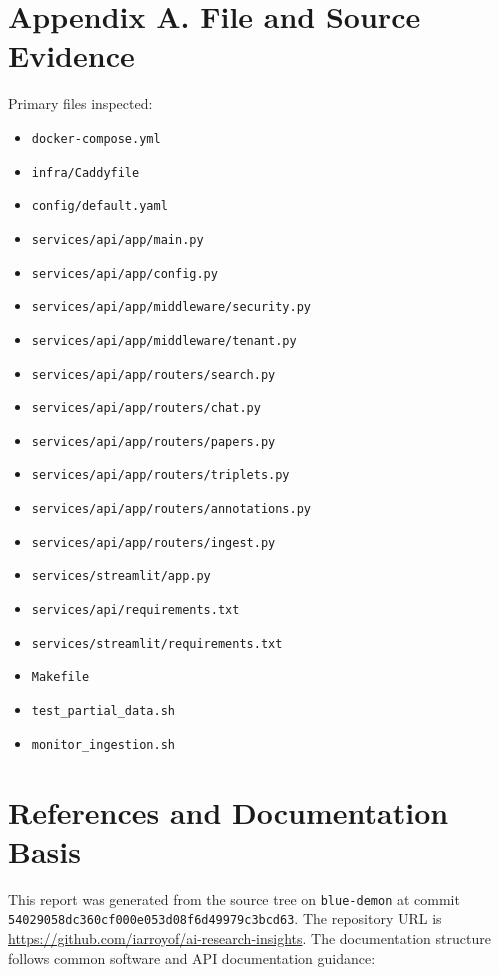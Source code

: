 \documentclass[10pt,letterpaper]{article}
\begin{document}
\section{Appendix A. File and Source Evidence}

Primary files inspected:

\begin{itemize}
\item \texttt{docker-compose.yml}
\item \texttt{infra/Caddyfile}
\item \texttt{config/default.yaml}
\item \texttt{services/api/app/main.py}
\item \texttt{services/api/app/config.py}
\item \texttt{services/api/app/middleware/security.py}
\item \texttt{services/api/app/middleware/tenant.py}
\item \texttt{services/api/app/routers/search.py}
\item \texttt{services/api/app/routers/chat.py}
\item \texttt{services/api/app/routers/papers.py}
\item \texttt{services/api/app/routers/triplets.py}
\item \texttt{services/api/app/routers/annotations.py}
\item \texttt{services/api/app/routers/ingest.py}
\item \texttt{services/streamlit/app.py}
\item \texttt{services/api/requirements.txt}
\item \texttt{services/streamlit/requirements.txt}
\item \texttt{Makefile}
\item \texttt{test\_partial\_data.sh}
\item \texttt{monitor\_ingestion.sh}
\end{itemize}


\section{References and Documentation Basis}

This report was generated from the source tree on \texttt{blue-demon} at commit \texttt{54029058dc360cf000e053d08f6d49979c3bcd63}. The repository URL is \url{https://github.com/iarroyof/ai-research-insights}. The documentation structure follows common software and API documentation guidance:
\end{document}
